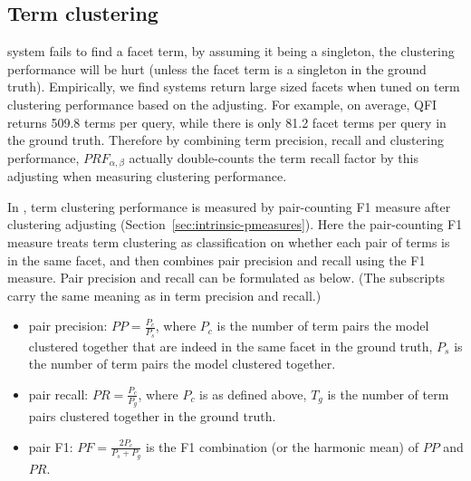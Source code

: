 \subsection{Term clustering}
system fails to find a facet term, by assuming it being a singleton, the clustering performance will be hurt (unless the facet term is a singleton in the ground truth). Empirically, we find systems return large sized facets when tuned on term clustering performance based on the adjusting. For example, on average, QFI returns 509.8 terms per query, while there is only 81.2 facet terms per query in the ground truth. Therefore by combining term precision, recall and clustering performance, $P\!R\!F_{\alpha,\beta}$ actually double-counts the term recall factor by this adjusting when measuring clustering performance. 

In \PRF, term clustering performance is measured by pair-counting F1 measure after clustering adjusting (Section~\ref{sec:intrinsic-pmeasures}). Here the pair-counting F1 measure treats term clustering as classification on whether each pair of terms is in the same facet, and then combines pair precision and recall using the F1 measure. Pair precision and recall can be formulated as below. (The subscripts carry the same meaning as in term precision and recall.)
\begin{itemize}
 \item pair precision: $P\!P = \frac{P_c}{P_s}$, where $P_c$ is the number of term pairs the model clustered together that are indeed in the same facet in the ground truth, $P_s$ is the number of term pairs the model clustered together. 
 \item pair recall: $P\!R = \frac{P_c}{P_g}$, where $P_c$ is as defined above, $T_g$ is the number of term pairs clustered together in the ground truth.
 \item pair F1: $P\!F=\frac{2P_c}{P_s+P_g}$ is the F1 combination (or the harmonic mean) of $P\!P$ and $P\!R$.
\end{itemize}

